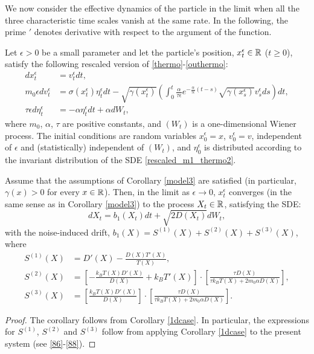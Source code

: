 We now consider the effective dynamics of the particle in the limit when all the three characteristic time scales vanish at the same rate. In the following, the prime $'$ denotes derivative with respect to the argument of the function. 


\begin{corollary} \label{cor1_thermo}
Let $\epsilon > 0$ be a small parameter and let the particle's position, $x^\epsilon_t \in \mathbb{R}$ ($t \geq 0$), satisfy the following rescaled version of \eqref{thermo}-\eqref{outhermo}:
\begin{align}
dx^\epsilon_t &= v^\epsilon_t dt, \label{rescaled_m1_thermo0} \\
m_0 \epsilon d v^\epsilon_{t} &= \sigma(x^\epsilon_{t}) \eta^\epsilon_{t} dt - \sqrt{\gamma(x^\epsilon_{t})} \left( \int_{0}^{t} \frac{\alpha}{\tau \epsilon} e^{-\frac{\alpha}{\tau \epsilon}\left(t-s\right)} \sqrt{\gamma(x^\epsilon_{s})} v^\epsilon_{s} ds \right) dt, \label{rescaled_m1_thermo1} \\
\tau \epsilon d\eta^\epsilon_t &= -\alpha \eta^\epsilon_t dt + \alpha dW_t, \label{rescaled_m1_thermo2}
\end{align}
where $m_0$, $\alpha$, $\tau$ are positive constants, and $(W_t)$ is a one-dimensional Wiener process. The initial conditions are random variables $x^\epsilon_0 = x$, $v^\epsilon_0 = v$, independent of $\epsilon$ and (statistically) independent of $(W_t)$, and $\eta^\epsilon_0$ is distributed according to the invariant distribution of the SDE \eqref{rescaled_m1_thermo2}. 

Assume that the assumptions of Corollary \ref{model3} are satisfied (in particular, $\gamma(x) > 0$ for every $x \in \mathbb{R}$). Then, in the limit as $\epsilon \to 0$,  $x^\epsilon_t$ converges (in the same sense as in Corollary \ref{model3}) to the process $X_{t} \in \mathbb{R}$, satisfying the SDE:
\begin{equation} \label{limitthermo}
dX_{t} = b_{1}(X_{t}) dt + \sqrt{2 D(X_{t})} dW_{t},
\end{equation}
with the noise-induced drift, $b_{1}(X) = S^{(1)}(X) + S^{(2)}(X) + S^{(3)}(X)$, where  
\begin{align}
S^{(1)}(X) &= D'(X)-\frac{D(X)T'(X)}{T(X)},\\
S^{(2)}(X) &= \left[-\frac{k_{B}T(X)D'(X)}{D(X)}+ k_{B}T'(X) \right] \cdot \left[\frac{ \tau D(X)}{\tau k_{B}T(X)+2m_{0}\alpha D(X)} \right], \\
S^{(3)}(X) &= \left[\frac{k_{B}T(X)D'(X)}{D(X)} \right] \cdot \left[\frac{ \tau D(X)}{\tau k_{B}T(X)+2m_{0}\alpha D(X)} \right].
\end{align}
\end{corollary}
\begin{proof}
The corollary follows from  Corollary \ref{1dcase}. In particular, the expressions for $S^{(1)}$, $S^{(2)}$ and $S^{(3)}$ follow from applying Corollary \ref{1dcase} to the present system (see \eqref{86}-\eqref{88}). 
\end{proof}


